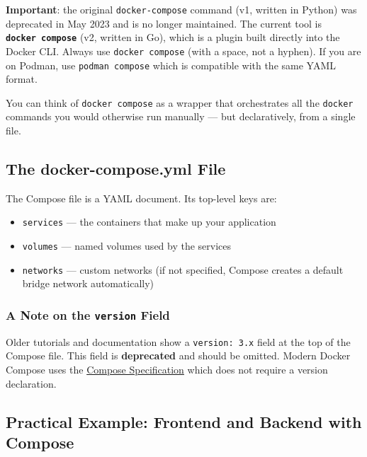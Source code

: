 \documentclass[11pt,american,a4paper,openany]{book}
\renewenvironment{quote}{\begin{quoteblock}}{\end{quoteblock}}
\providecommand{\tightlist}{%
  \setlength{\itemsep}{2pt}\setlength{\parskip}{0pt}}
\begin{document}
\begin{quote}
\textbf{Important}: the original \texttt{docker-compose} command (v1,
written in Python) was deprecated in May 2023 and is no longer
maintained. The current tool is \textbf{\texttt{docker\ compose}} (v2,
written in Go), which is a plugin built directly into the Docker CLI.
Always use \texttt{docker\ compose} (with a space, not a hyphen). If you
are on Podman, use \texttt{podman\ compose} which is compatible with the
same YAML format.
\end{quote}

You can think of \texttt{docker\ compose} as a wrapper that orchestrates
all the \texttt{docker} commands you would otherwise run manually ---
but declaratively, from a single file.

\subsection{The docker-compose.yml
File}\label{the-docker-compose.yml-file}

The Compose file is a YAML document. Its top-level keys are:

\begin{itemize}
\tightlist
\item
  \texttt{services} --- the containers that make up your application
\item
  \texttt{volumes} --- named volumes used by the services
\item
  \texttt{networks} --- custom networks (if not specified, Compose
  creates a default bridge network automatically)
\end{itemize}

\subsubsection{\texorpdfstring{A Note on the \texttt{version}
Field}{A Note on the version Field}}\label{a-note-on-the-version-field}

Older tutorials and documentation show a
\texttt{version:\ \textquotesingle{}3.x\textquotesingle{}} field at the
top of the Compose file. This field is \textbf{deprecated} and should be
omitted. Modern Docker Compose uses the
\href{https://compose-spec.io/}{Compose Specification} which does not
require a version declaration.

\subsection{Practical Example: Frontend and Backend with
Compose}\label{practical-example-frontend-and-backend-with-compose}
\end{document}
